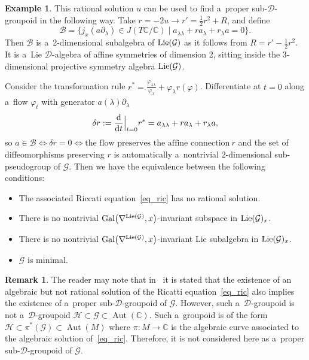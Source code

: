 \documentclass[pdftex]{sigma}
\numberwithin{equation}{section}
\theoremstyle{definition}
\newtheorem{Example}[Theorem]{Example}
\newtheorem{Remark}[Theorem]{Remark}
\begin{document}
\begin{Example}
This rational solution $u$ can be used to find a~proper sub-$\mathcal D$-groupoid in the following way. Take $r = -2u \to r' = \frac{1}{2}r^2+R$, and define
\[\mathcal{B} = \{j_x (a \partial_\lambda) \in J(T\mathbb C/\mathbb C) \mid a_{\lambda\lambda}+ra_\lambda+r_\lambda a=0\}.
\]
Then $\mathcal{B}$ is a~2-dimensional subalgebra of ${\rm Lie}(\mathcal G)$ as it follows from $R = r'-\frac{1}{2}r^2$. It is a~Lie $\mathcal D$-algebra of affine symmetries of dimension 2, sitting inside the $3$-dimensional projective symmetry algebra ${\rm Lie}(\mathcal G)$.

Consider the transformation rule $r^*=\frac{\varphi_{\lambda\lambda}}{\varphi_\lambda}+\varphi_\lambda r(\varphi)$.
Differentiate at $t = 0$ along a~flow $\varphi_t$ with generator $a(\lambda)\partial_\lambda$
\[\delta r := \dfrac{\rm d}{{\rm d}t}\Big|_{t=0}r^* = a_{\lambda\lambda}+ra_\lambda+r_\lambda a,\]
so $a \in \mathcal{B} \Longleftrightarrow \delta r = 0 \Longleftrightarrow \text{the flow preserves the affine connection}\ r$ and the set of diffeomorphisms preserving $r$ is automatically a~nontrivial $2$-dimensional sub-pseudogroup of $\mathcal G$. Then we have the equivalence between the following conditions:
\begin{itemize}\itemsep=0pt
 \item[(i)] The associated Riccati equation~\eqref{eq_ric}
 has no rational solution.
 \item[(ii)] There is no nontrivial ${\rm Gal}\bigl(\nabla^{{\rm Lie}(\mathcal G)},x\bigr)$-invariant subspace in ${\rm Lie}(\mathcal G)_x$.
 \item[(iii)] There is no nontrivial ${\rm Gal}\bigl(\nabla^{{\rm Lie}(\mathcal G)},x\bigr)$-invariant Lie subalgebra in ${\rm Lie}(\mathcal G)_x$.
 \item[(iv)] $\mathcal G$ is minimal.
\end{itemize}
\end{Example}

\begin{Remark}
The reader may note that in~\cite[Proposition 3.6]{Casale_BlazquezSanz_ArenasTirado_2025} it is stated that the existence of an algebraic but not rational solution of the Ricatti equation~\eqref{eq_ric} also implies the existence of a~proper sub-$\mathcal D$-groupoid of $\mathcal G$. However, such a~$\mathcal D$-groupoid is not a~$\mathcal D$-groupoid $\mathcal H\subset\mathcal G\subset \operatorname{Aut}(\mathbb C)$. Such a~groupoid is of the form $\mathcal H\subset \pi^{*}(\mathcal G) \subset \operatorname{Aut}(M)$ where $\pi\colon M\to \mathbb C$ is the algebraic curve associated to the algebraic solution of~\eqref{eq_ric}. Therefore, it is not considered here as a~proper sub-$\mathcal D$-groupoid of $\mathcal G$.
\end{Remark}
\end{document}
